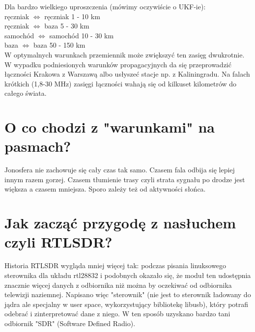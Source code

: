 \documentclass[a4paper,12pt]{article}
\begin{document}
Dla bardzo wielkiego uproszczenia (mówimy oczywiście o UKF-ie):\\
ręczniak $\Leftrightarrow$ ręczniak 1 - 10 km\\
ręczniak $\Leftrightarrow$ baza 5 - 30 km\\
samochód $\Leftrightarrow$ samochód 10 - 30 km\\
baza $\Leftrightarrow$ baza 50 - 150 km \\

W optymalnych warunkach przemiennik może zwiększyć ten zasięg dwukrotnie.
W wypadku podniesionych warunków propagacyjnych da się przeprowadzić łączności Krakowa z Warszawą albo usłyszeć stacje np. z Kaliningradu.
Na falach krótkich (1,8-30 MHz) zasięgi łączności wahają się od kilkuset kilometrów do całego świata. 

\section{O co chodzi z "warunkami" na pasmach?}
Jonosfera nie zachowuje się cały czas tak samo. Czasem fala odbija się lepiej innym razem gorzej. Czasem tłumienie trasy czyli strata sygnału po drodze jest większa a czasem mniejsza. 
Sporo zależy też od aktywności słońca.

\section{Jak zacząć przygodę z nasłuchem czyli RTLSDR?}
Historia RTLSDR wygląda mniej więcej tak: podczas pisania linuksowego sterownika dla układu rtl28832 i podobnych okazało się, że moduł ten udostępnia znacznie więcej danych z odbiornika niż można by oczekiwać od odbiornika telewizji naziemnej. Napisano więc "sterownik" (nie jest to sterownik ładowany do jądra ale specjalny w user space, wykorzystujący bibliotekę libusb), który potrafi odebrać i zinterpretować dane z niego. W ten sposób uzyskano bardzo tani odbiornik "SDR" (Software Defined Radio).
\end{document}
